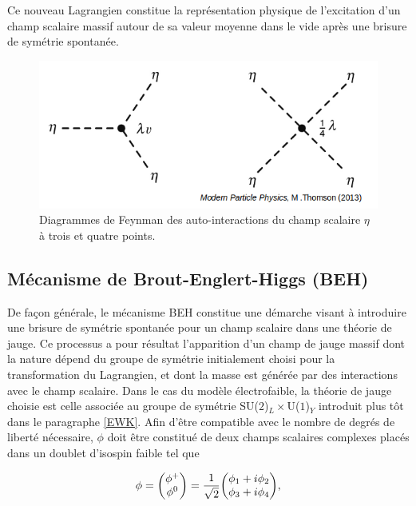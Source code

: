         Ce nouveau Lagrangien constitue la représentation physique de l'excitation d'un champ scalaire massif autour de sa valeur moyenne dans le vide après une brisure de symétrie spontanée.

        \begin{figure}
        \centering
            \includegraphics[scale=0.45]{Chapitre2/Images/higgsVtx.png} 
            \caption{Diagrammes de Feynman des auto-interactions du champ scalaire $\eta$ à trois et quatre points.}
        \label{higgsVtx}
        \end{figure}

        \subsection{Mécanisme de Brout-Englert-Higgs (BEH)}
        \label{higgsmeca}

        De façon générale, le mécanisme BEH constitue une démarche visant à introduire une brisure de symétrie spontanée pour un champ scalaire dans une théorie de jauge. Ce processus a pour résultat l'apparition d'un champ de jauge massif dont la nature dépend du groupe de symétrie initialement choisi pour la transformation du Lagrangien, et dont la masse est générée par des interactions avec le champ scalaire. Dans le cas du modèle électrofaible, la théorie de jauge choisie est celle associée au groupe de symétrie SU($2$)$_L\times$U($1$)$_Y$ introduit plus tôt dans le paragraphe \ref{EWK}. Afin d'être compatible avec le nombre de degrés de liberté nécessaire, $\phi$ doit être constitué de deux champs scalaires complexes placés dans un doublet d'isospin faible tel que 

        \begin{equation}
            \phi = \mqty(\phi^+ \\ \phi^0) = \frac{1}{\sqrt{2}}\mqty(\phi_1+i\phi_2 \\ \phi_3 + i\phi_4),
        \label{higgsdoublet}
        \end{equation}

